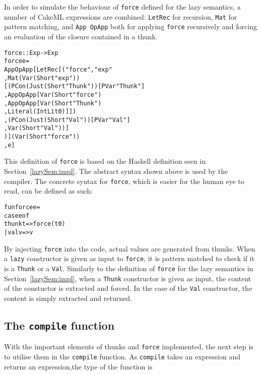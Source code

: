 In order to simulate the behaviour of \texttt{force} defined for the lazy
semantics, a number of CakeML expressions are combined:
\texttt{LetRec} for recursion, \texttt{Mat} for pattern
matching, and \texttt{App OpApp} both for applying \texttt{force} recursively
and forcing an evaluation of the closure contained in a thunk.

\begin{alltt}
force :: Exp -> Exp
force e =
  App OpApp [LetRec [("force", "exp"
                     , Mat (Var (Short "exp"))
                       [(PCon (Just (Short "Thunk")) [PVar "Thunk"]
                        , App OpApp [Var (Short "force")
                                    , App OpApp [Var (Short "Thunk")
                                                , Literal (IntLit 0)]])
                       ,(PCon (Just (Short "Val")) [PVar "Val"]
                        , Var (Short "Val"))]
                     )] (Var (Short "force"))
            , e]
\end{alltt}

\noindent This definition of \texttt{force} is based on the Haskell definition
seen in Section~\ref{lazySem:impl}. The abstract syntax shown above is used by
the compiler. The concrete syntax for \texttt{force}, which is easier for the
human eye to read, can be defined as such:

\begin{alltt}
  fun force e =
    case e of
      thunk t => force (t 0)
      | val v => v
\end{alltt}


\noindent By injecting \texttt{force} into the code, actual values are generated
from thunks. When a \texttt{lazy} constructor is given
as input to \texttt{force}, it is pattern matched to check if it is a
\texttt{Thunk} or a \texttt{Val}. Similarly to the definition of \texttt{force}
for the lazy semantics in Section~\ref{lazySem:impl}, when a \texttt{Thunk}
constructor is given as input, the content of the constuctor is extracted and
forced. In the case of the \texttt{Val} constructor, the content is simply
extracted and returned.

\subsection{The \texttt{compile} function}
With the important elements of thunks and \texttt{force} implemented, the next
step is to utilise them in the \texttt{compile} function. 
As \texttt{compile} takes an expression and returns an expression,the type of
the function is

